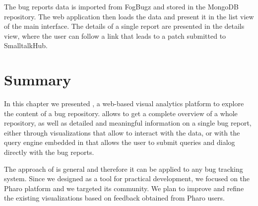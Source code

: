 
The bug reports data is imported from FogBugz and stored in the MongoDB repository.
The web application then loads the data and present it in the list view of the main interface.
The details of a single report are presented in the details view, where the user can follow a link that leads to a patch submitted to SmalltalkHub.
%

\section{Summary}

In this chapter we presented \ib, a web-based visual analytics platform to explore the content of a bug repository.
\ib allows to get a complete overview of a whole repository, as well as detailed and meaningful information on a single bug report, either through visualizations that allow to interact with the data, or with the query engine embedded in \ib that allows the user to submit queries and dialog directly with the bug reports.


The approach of \ib is general and therefore it can be applied to any bug tracking system.
Since we designed \ib as a tool for practical development, we focused on the Pharo platform and we targeted its community.
We plan to improve \ib and refine the existing visualizations based on feedback obtained from Pharo users.







